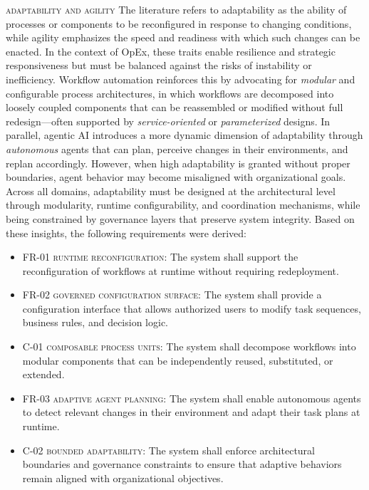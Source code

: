 \noindent \textsc{adaptability and agility} \quad The literature refers to adaptability as the ability of processes or components to be reconfigured in response to changing conditions, while agility emphasizes the speed and readiness with which such changes can be enacted. In the context of OpEx, these traits enable resilience and strategic responsiveness but must be balanced against the risks of instability or inefficiency. Workflow automation reinforces this by advocating for \emph{modular} and configurable process architectures, in which workflows are decomposed into loosely coupled components that can be reassembled or modified without full redesign—often supported by \emph{service-oriented} or \emph{parameterized} designs. In parallel, agentic AI introduces a more dynamic dimension of adaptability through \emph{autonomous} agents that can plan, perceive changes in their environments, and replan accordingly. However, when high adaptability is granted without proper boundaries, agent behavior may become misaligned with organizational goals. Across all domains, adaptability must be designed at the architectural level through modularity, runtime configurability, and coordination mechanisms, while being constrained by governance layers that preserve system integrity. Based on these insights, the following requirements were derived:

\begin{itemize}
  \item \textsc{FR-01 runtime reconfiguration}: The system shall support the reconfiguration of workflows at runtime without requiring redeployment.
  \item \textsc{FR-02 governed configuration surface}: The system shall provide a configuration interface that allows authorized users to modify task sequences, business rules, and decision logic.
  \item \textsc{C-01 composable process units}: The system shall decompose workflows into modular components that can be independently reused, substituted, or extended.
  \item \textsc{FR-03 adaptive agent planning}: The system shall enable autonomous agents to detect relevant changes in their environment and adapt their task plans at runtime.
  \item \textsc{C-02 bounded adaptability}: The system shall enforce architectural boundaries and governance constraints to ensure that adaptive behaviors remain aligned with organizational objectives.
\end{itemize}


















